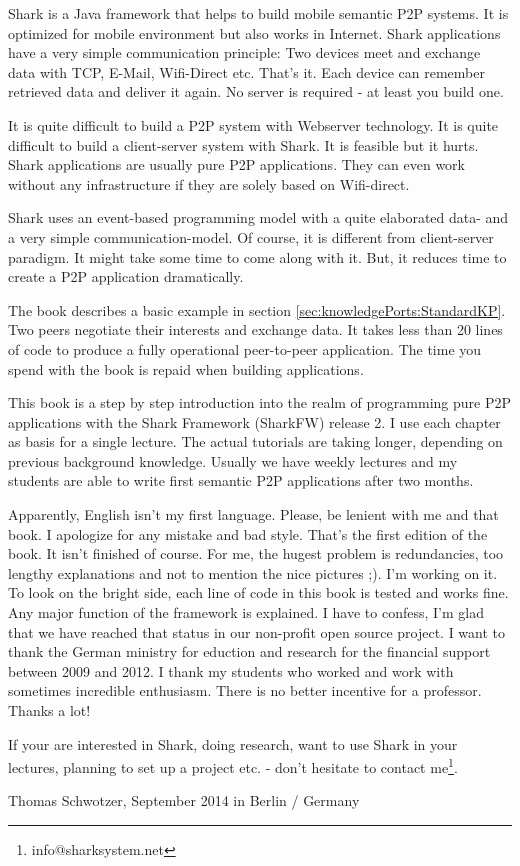 Shark is a Java framework that helps to build mobile semantic P2P systems. It is optimized for mobile environment but also works in Internet. Shark applications have a very simple communication principle: Two devices meet and exchange data with TCP, E-Mail, Wifi-Direct etc. That's it. Each device can remember retrieved data and deliver it again. No server is required - at least you build one. 

It is quite difficult to build a P2P system with Webserver technology. It is quite difficult to build a client-server system with Shark. It is feasible but it hurts. Shark applications are usually pure P2P applications. They can even work without any infrastructure if they are solely based on Wifi-direct.

Shark uses an event-based programming model with a quite elaborated data- and a very simple communication-model. Of course, it is different from client-server paradigm. It might take some time to come along with it. But, it reduces time to create a P2P application dramatically. 

The book describes a basic example in section \ref{sec:knowledgePorts:StandardKP}. Two peers negotiate their interests and exchange data. It takes less than 20 lines of code to produce a fully operational peer-to-peer application. The time you spend with the book is repaid when building applications.

This book is a step by step introduction into the realm of programming pure 
P2P applications with the Shark Framework (SharkFW) release 2. I use each 
chapter as basis for a single lecture. The actual tutorials are taking longer, depending on previous background knowledge. Usually we have weekly lectures and my students are able to write first semantic P2P applications after two months.

Apparently, English isn't my first language. Please, be lenient with me and that book. I apologize for any mistake and bad style. That's the first edition of the book. It isn't finished of course. For me, the hugest problem is redundancies, too lengthy explanations and not to mention the nice pictures ;). I'm working on it. To look on the bright side, each line of code in this book is tested and works fine. Any major function of the framework is explained. I have to confess, I'm glad that we have reached that status in our non-profit open source project.
I want to thank the German ministry for eduction and research for the financial support between 2009 and 2012. I thank my students who worked and work with sometimes incredible enthusiasm. There is no better incentive for a professor. Thanks a lot!

If your are interested in Shark, doing research, want to use Shark in your lectures, planning to set up a project etc. - don't hesitate to contact me\footnote{info@sharksystem.net}.

\vspace{1,5cm}

Thomas Schwotzer, September 2014 in Berlin / Germany
